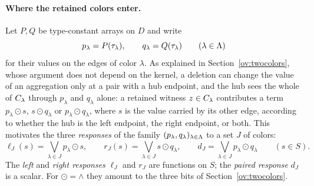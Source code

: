 \paragraph{Where the retained colors enter.}
Let $P,Q$ be type-constant arrays on $D$ and write
\[
 p_\lambda=P(\tau_{\lambda}),\qquad q_\lambda=Q(\tau_{\lambda})
 \qquad(\lambda\in\Lambda)
\]
for their values on the edges of color $\lambda$. As explained in
Section~\ref{ov:twocolors}, whose argument does not depend on the kernel, a
deletion can change the value of an aggregation only at a pair with a hub
endpoint, and the hub sees the whole of $C_{\lambda}$ through $p_\lambda$
and $q_\lambda$ alone: a retained witness $z\in C_{\lambda}$ contributes a
term $p_\lambda\odot s$, $s\odot q_\lambda$ or $p_\lambda\odot q_\lambda$,
where $s$ is the value carried by its other edge, according to whether the
hub is the left endpoint, the right endpoint, or both. This motivates the
three \emph{responses} of the family $(p_\lambda,q_\lambda)_{\lambda\in\Lambda}$
to a set $J$ of colors:
\begin{equation}\label{eq:responses}
 \ell_J(s)=\bigvee_{\lambda\in J}p_\lambda\odot s,\qquad
 r_J(s)=\bigvee_{\lambda\in J}s\odot q_\lambda,\qquad
 d_J=\bigvee_{\lambda\in J}p_\lambda\odot q_\lambda
 \qquad(s\in S).
\end{equation}
The \emph{left} and \emph{right responses} $\ell_J$ and $r_J$ are functions
on $S$; the \emph{paired response} $d_J$ is a scalar. For $\odot=\land$ they amount to the three bits of Section~\ref{ov:twocolors}.

